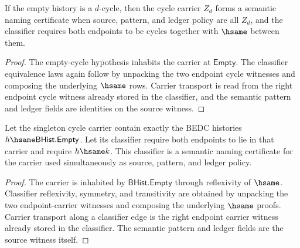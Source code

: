 \begin{theorem}
\label{thm:homology-cycle-carrier-empty-semantic-namecert}
If the empty history is a $d$-cycle, then the cycle carrier $Z_d$ forms a
semantic naming certificate when source, pattern, and ledger policy are all
$Z_d$, and the classifier requires both endpoints to be cycles together with
$\hsame$ between them.
\end{theorem}
\begin{proof}
The empty-cycle hypothesis inhabits the carrier at $\mathsf{Empty}$. The
classifier equivalence laws again follow by unpacking the two endpoint cycle
witnesses and composing the underlying $\hsame$ rows. Carrier transport is
read from the right endpoint cycle witness already stored in the classifier,
and the semantic pattern and ledger fields are identities on the source
witness.
\end{proof}

\begin{theorem}
\label{thm:homology-singleton-cycle-semantic-namecert}
Let the singleton cycle carrier contain exactly the BEDC histories
$h\hsame\mathsf{BHist.Empty}$. Let its classifier require both endpoints to
lie in that carrier and require $h\hsame k$. This classifier is a semantic
naming certificate for the carrier used simultaneously as source, pattern,
and ledger policy.
\end{theorem}
\begin{proof}
The carrier is inhabited by $\mathsf{BHist.Empty}$ through reflexivity of
$\hsame$. Classifier reflexivity, symmetry, and transitivity are obtained by
unpacking the two endpoint-carrier witnesses and composing the underlying
$\hsame$ proofs. Carrier transport along a classifier edge is the right
endpoint carrier witness already stored in the classifier. The semantic
pattern and ledger fields are the source witness itself.
\end{proof}

